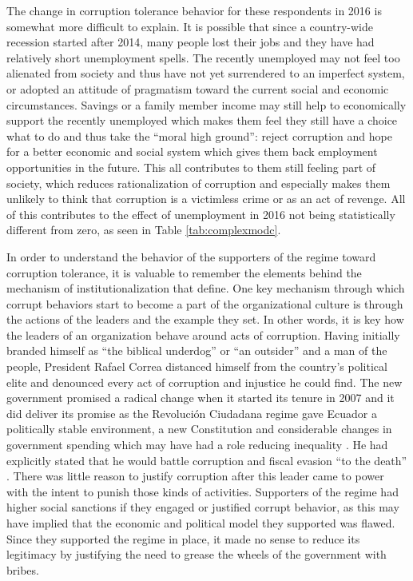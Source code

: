 \documentclass[floatsintext,man]{apa7}\usepackage[]{graphicx}\usepackage[]{color}
\begin{document}
The change in corruption tolerance behavior for these respondents in 2016 is somewhat more difficult to explain. It is possible that since a country-wide recession started after 2014, many people lost their jobs and they have had relatively short unemployment spells. The recently unemployed may not feel too alienated from society and thus have not yet surrendered to an imperfect system, or adopted an attitude of pragmatism toward the current social and economic circumstances. Savings or a family member income may still help to economically support the recently unemployed which makes them feel they still have a choice what to do and thus take the \enquote{moral high ground}: reject corruption and hope for a better economic and social system which gives them back employment opportunities in the future. This all contributes to them still feeling part of society, which reduces rationalization of corruption and especially makes them unlikely to think that corruption is a victimless crime or as an act of revenge. All of this contributes to the effect of unemployment in 2016 not being statistically different from zero, as seen in Table \ref{tab:complexmodc}. 

In order to understand the behavior of the supporters of the regime toward corruption tolerance, it is valuable to remember the elements behind the mechanism of institutionalization that \textcite{Ashforth.2003} define. One key mechanism through which corrupt behaviors start to become a part of the organizational culture is through the actions of the leaders and the example they set. In other words, it is key how the leaders of an organization behave around acts of corruption. Having initially branded himself as \enquote{the biblical underdog} or \enquote{an outsider} \parencite[para. 4 \& 24]{Hedgecoe.2009} and a man of the people, President Rafael Correa distanced himself from the country's political elite and denounced every act of corruption and injustice he could find. The new government promised a radical change when it started its tenure in 2007 and it did deliver its promise as the Revolución Ciudadana regime gave Ecuador a politically stable environment, a new Constitution and considerable changes in government spending which may have had a role reducing inequality \parencite{Weisbrot.2017}.  He had explicitly stated that he would battle corruption and fiscal evasion \enquote{to the death} \parencite{Ortiz.2013}. There was little reason to justify corruption after this leader came to power with the intent to punish those kinds of activities. Supporters of the regime had higher social sanctions if they engaged or justified corrupt behavior, as this may have implied that the economic and political model they supported was flawed. Since they supported the regime in place, it made no sense to reduce its legitimacy by justifying the need to grease the wheels of the government with bribes. 
\end{document}
